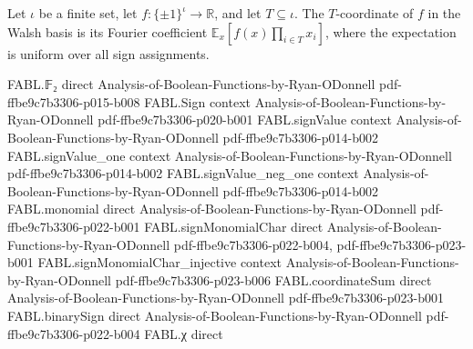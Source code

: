 \begin{theorem}
\label{FABL.indexedWalshBasis_repr_eq_indexedFourierCoeff}
\leanok
{}
Let $\iota$ be a finite set, let $f:\{\pm1\}^{\iota}\to\mathbb R$, and let
$T\subseteq\iota$. The $T$-coordinate of $f$ in the Walsh basis is its Fourier
coefficient $\mathbb E_x[f(x)\prod_{i\in T}x_i]$, where the expectation is uniform over
all sign assignments.
\end{theorem}

\begin{theorem}
\label{FABL.indexed_fourier_expansion}
\leanok
{}
\proofstep
  {FABL.𝔽₂}
  {direct}
  {Analysis-of-Boolean-Functions-by-Ryan-ODonnell}
  {pdf-ffbe9c7b3306-p015-b008}
\proofstep
  {FABL.Sign}
  {context}
  {Analysis-of-Boolean-Functions-by-Ryan-ODonnell}
  {pdf-ffbe9c7b3306-p020-b001}
\proofstep
  {FABL.signValue}
  {context}
  {Analysis-of-Boolean-Functions-by-Ryan-ODonnell}
  {pdf-ffbe9c7b3306-p014-b002}
\proofstep
  {FABL.signValue_one}
  {context}
  {Analysis-of-Boolean-Functions-by-Ryan-ODonnell}
  {pdf-ffbe9c7b3306-p014-b002}
\proofstep
  {FABL.signValue_neg_one}
  {context}
  {Analysis-of-Boolean-Functions-by-Ryan-ODonnell}
  {pdf-ffbe9c7b3306-p014-b002}
\proofstep
  {FABL.monomial}
  {direct}
  {Analysis-of-Boolean-Functions-by-Ryan-ODonnell}
  {pdf-ffbe9c7b3306-p022-b001}
\proofstep
  {FABL.signMonomialChar}
  {direct}
  {Analysis-of-Boolean-Functions-by-Ryan-ODonnell}
  {pdf-ffbe9c7b3306-p022-b004,
    pdf-ffbe9c7b3306-p023-b001}
\proofstep
  {FABL.signMonomialChar_injective}
  {context}
  {Analysis-of-Boolean-Functions-by-Ryan-ODonnell}
  {pdf-ffbe9c7b3306-p023-b006}
\proofstep
  {FABL.coordinateSum}
  {direct}
  {Analysis-of-Boolean-Functions-by-Ryan-ODonnell}
  {pdf-ffbe9c7b3306-p023-b001}
\proofstep
  {FABL.binarySign}
  {direct}
  {Analysis-of-Boolean-Functions-by-Ryan-ODonnell}
  {pdf-ffbe9c7b3306-p022-b004}
\proofstep
  {FABL.χ}
  {direct}

\end{theorem}
